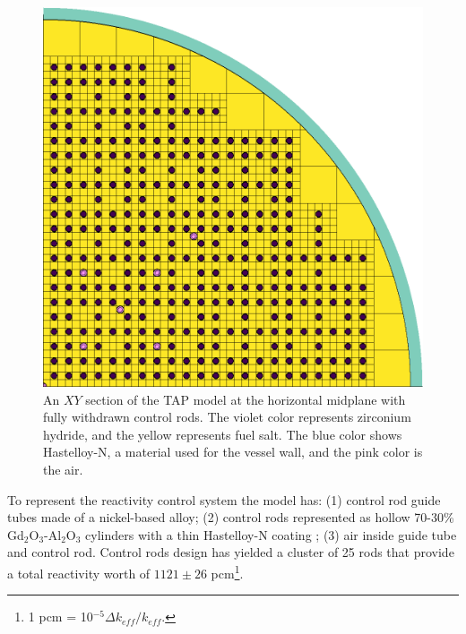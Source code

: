 \documentclass{anstrans}
\begin{document}
\begin{figure}[htp!] %
	\centering
	\includegraphics[width=\linewidth]{tap_plan_view.png}
	\caption{An $XY$ section of the \gls{TAP} model at the horizontal midplane 
		with fully withdrawn control rods. The violet color represents 
		zirconium hydride, and the yellow represents fuel salt. The blue color 
		shows Hastelloy-N, a material used for the vessel wall, and the pink 
		color is the air.}
	\label{fig:tap-serpent-plan}
\end{figure}

To represent the reactivity control system the 
model has: (1) control rod guide tubes made of a nickel-based alloy; (2) 
control 
rods represented as hollow 70-30\% Gd$_2$O$_3$-Al$_2$O$_3$ cylinders with a 
thin Hastelloy-N coating \cite{betzler_assessment_2017}; (3) air inside guide 
tube and control rod. Control rods design has yielded a cluster of 25 rods 
that provide a total reactivity worth of $1121\pm26$ pcm\footnote{ 1 pcm = 
10$^{-5}\Delta k_{eff}/k_{eff}$.}.
\end{document}
